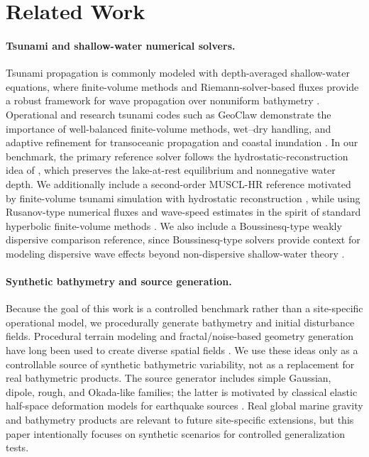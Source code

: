 \section{Related Work}

\paragraph{Tsunami and shallow-water numerical solvers.}
Tsunami propagation is commonly modeled with depth-averaged shallow-water equations, where finite-volume methods and Riemann-solver-based fluxes provide a robust framework for wave propagation over nonuniform bathymetry \citep{leveque2002finite,toro2009riemann}. Operational and research tsunami codes such as GeoClaw demonstrate the importance of well-balanced finite-volume methods, wet--dry handling, and adaptive refinement for transoceanic propagation and coastal inundation \citep{leveque2011tsunami,berger2011geoclaw}. In our benchmark, the primary reference solver follows the hydrostatic-reconstruction idea of \citet{audusse2004hydrostatic}, which preserves the lake-at-rest equilibrium and nonnegative water depth. We additionally include a second-order MUSCL-HR reference motivated by finite-volume tsunami simulation with hydrostatic reconstruction \citep{clain2016secondorder}, while using Rusanov-type numerical fluxes and wave-speed estimates in the spirit of standard hyperbolic finite-volume methods \citep{toro2009riemann,toro2026rusanov}. We also include a Boussinesq-type weakly dispersive comparison reference, since Boussinesq-type solvers provide context for modeling dispersive wave effects beyond non-dispersive shallow-water theory \citep{shi2012funwave,charlier2022boussinesq}.

\paragraph{Synthetic bathymetry and source generation.}
Because the goal of this work is a controlled benchmark rather than a site-specific operational model, we procedurally generate bathymetry and initial disturbance fields. Procedural terrain modeling and fractal/noise-based geometry generation have long been used to create diverse spatial fields \citep{musgrave1989terrain}. We use these ideas only as a controllable source of synthetic bathymetric variability, not as a replacement for real bathymetric products. The source generator includes simple Gaussian, dipole, rough, and Okada-like families; the latter is motivated by classical elastic half-space deformation models for earthquake sources \citep{okada1985surface}. Real global marine gravity and bathymetry products \citep{sandwell2014gravity} are relevant to future site-specific extensions, but this paper intentionally focuses on synthetic scenarios for controlled generalization tests.

